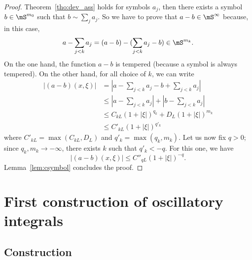 \begin{proof}
	Theorem~\ref{tho:dev_ass} holds for symbols $a_j$, then there exists a symbol $b\in\mS^{m_0}$ such that $b\sim\sum_{j}a_j$. So we have to prove that $a-b\in\mS^{\infty}$ because, in this case,
	\[
		a-\sum_{j<k}a_j=(a-b)-(\sum_{j<k}a_j-b)\in\mS^{m_k}.
	\]
	On the one hand, the function $a-b$ is tempered (because a symbol is always tempered). On the other hand, for all choice of $k$, we can write
	\begin{equation}
		\begin{aligned}
			|(a-b)(x,\xi)| & =|a-\sum_{j<k}a_j-b+\sum_{j<k}a_j|            \\
			               & \leq|a-\sum_{j<k}a_j|+|b-\sum_{j<k}a_j|       \\
			               & \leq C_{kL}(1+|\xi|)^{q_k}+D_L(1+|\xi|)^{m_k} \\
			               & \leq C'_{kL}(1+|\xi|)^{q'_k}
		\end{aligned}
	\end{equation}
	where $C'_{kL}=\max(C_{kL},D_L)$ and $q'_k=\max(q_k,m_k)$. Let us now fix $q>0$; since $q_k,m_k\to-\infty$, there exists $k$ such that $q'_k<-q$. For this one, we have
	\[
		|(a-b)(x,\xi)|\leq C''_{qL}(1+|\xi|)^{-q}.
	\]
	Lemma~\ref{lem:csymbol} concludes the proof.


\end{proof}


\section{First construction of oscillatory integrals}

\subsection{Construction}

